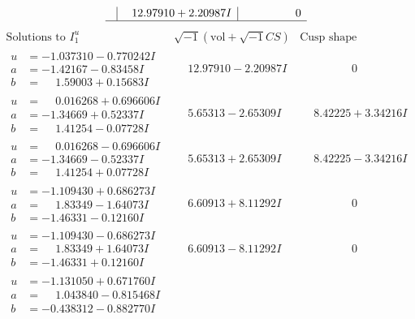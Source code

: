 \documentclass[1p]{elsarticle_modified}
\theoremstyle{definition}
\newcommand{\I}{\sqrt{-1}}
\begin{document}
$$\begin{array}{c|c|c}
 & \phantom{-}12.97910 + 2.20987 I & \phantom{-0.000000 } 0\\
 \hline 
 \end{array}$$\newpage$$\begin{array}{c|c|c}  
\text{Solutions to }I^u_{1}& \I (\text{vol} + \sqrt{-1}CS) & \text{Cusp shape}\\
 \hline 
\begin{aligned}
u &= -1.037310 - 0.770242 I \\
a &= -1.42167 - 0.83458 I \\
b &= \phantom{-}1.59003 + 0.15683 I\end{aligned}
 & \phantom{-}12.97910 - 2.20987 I & \phantom{-0.000000 } 0 \\ \hline\begin{aligned}
u &= \phantom{-}0.016268 + 0.696606 I \\
a &= -1.34669 + 0.52337 I \\
b &= \phantom{-}1.41254 - 0.07728 I\end{aligned}
 & \phantom{-}5.65313 - 2.65309 I & \phantom{-}8.42225 + 3.34216 I \\ \hline\begin{aligned}
u &= \phantom{-}0.016268 - 0.696606 I \\
a &= -1.34669 - 0.52337 I \\
b &= \phantom{-}1.41254 + 0.07728 I\end{aligned}
 & \phantom{-}5.65313 + 2.65309 I & \phantom{-}8.42225 - 3.34216 I \\ \hline\begin{aligned}
u &= -1.109430 + 0.686273 I \\
a &= \phantom{-}1.83349 - 1.64073 I \\
b &= -1.46331 - 0.12160 I\end{aligned}
 & \phantom{-}6.60913 + 8.11292 I & \phantom{-0.000000 } 0 \\ \hline\begin{aligned}
u &= -1.109430 - 0.686273 I \\
a &= \phantom{-}1.83349 + 1.64073 I \\
b &= -1.46331 + 0.12160 I\end{aligned}
 & \phantom{-}6.60913 - 8.11292 I & \phantom{-0.000000 } 0 \\ \hline\begin{aligned}
u &= -1.131050 + 0.671760 I \\
a &= \phantom{-}1.043840 - 0.815468 I \\
b &= -0.438312 - 0.882770 I\end{aligned}

\end{array}$$
\end{document}
